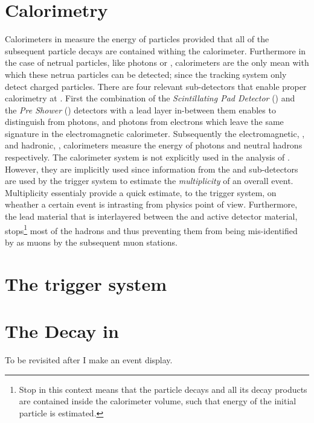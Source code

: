 \section{Calorimetry}
\label{det_calo}
Calorimeters in \lhcb measure the energy of particles provided that all of the subsequent particle decays are
contained withing the calorimeter. Furthermore in the case of netrual particles, like photons or \piz,
calorimeters are the only mean with which these netrua particles can be detected; since the tracking system
only detect charged particles. There are four relevant sub-detectors
that enable proper calorimetry at \lhcb. First the combination of the {\it Scintillating Pad Detector} (\spd)
and the {\it Pre Shower} (\presh) detectors with a lead layer in-between them enables to distinguish \piz from
photons, and photons from electrons which leave the same signature in the electromagnetic calorimeter.
Subsequently the electromagnetic, \ecal, and hadronic, \hcal, calorimeters measure the energy of photons
and neutral hadrons respectively. The calorimeter system is not explicitly used in the analysis of .
However, they are implicitly used since information from the \spd and \presh sub-detectors are used
by the \lzero trigger system to estimate the {\it multiplicity} of an overall event. Multiplicity essentialy
provide a quick estimate, to the \lzero trigger system, on wheather a certain event is intrasting from physics
point of view. Furthermore, the lead material that is interlayered between the \ecal and \hcal active detector material,
stops\footnote{Stop in this context means that the particle decays and all its decay products are contained inside the calorimeter
volume, such that energy of the initial particle is estimated.} most of the hadrons and thus preventing them
from being mis-identified by as muons by the subsequent muon stations.

\section{The trigger system}
\label{det_trigger}


\section{The \BJpsiKst Decay in \lhcb}
\label{BspsiKst_at_lhcb}
{\color{red} To be revisited after I make an event display.}

